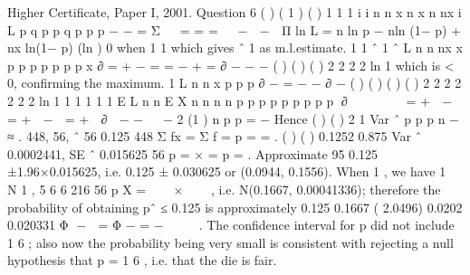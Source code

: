 \documentclass[a4paper,12pt]{article}
\begin{document}
Higher Certificate, Paper I, 2001. Question 6
( ) ( 1 ) ( )
1
1
1
i i
n n
x n x n nx
i
L p q p p q p p
p
− −
=
Σ   = = =   −  −  Π
ln L = n ln p − nln (1− p) + nx ln(1− p)
(ln ) 0 when 1 1 which gives ˆ 1 as m.l.estimate.
1 1 ˆ 1 ˆ
L n n nx x p
p p p p p p x
∂ = + − = = − + =
∂ − − −
( ) ( )
( )
2
2 2 2
ln 1
which is < 0, confirming the maximum.
1
L n n x
p p p
∂ −
= − −
∂ −
( ) ( ) ( ) ( )
2
2 2 2 2 2 2
ln 1 1 1
1 1 1
E L n n E X n n n n
p p p p p p p p p
∂        = +  −  = +  −  = +  ∂  − −   −
2 (1 )
n
p p
=
−
Hence ( ) ( ) 2 1
Var ˆ
p p
p
n
−
≈ .
448, 56, ˆ 56 0.125
448
Σ fx = Σ f = p = = .
( ) ( )
0.1252 0.875 Var ˆ 0.0002441, SE ˆ 0.015625
56
p = × = p = .
Approximate 95%
0.125 ±1.96×0.015625, i.e. 0.125 ± 0.030625 or (0.0944, 0.1556).
When 1 , we have 1 ~ N 1 , 5
6 6 216 56
p
X
=    ×   
, i.e. N(0.1667, 0.00041336); therefore
the probability of obtaining pˆ ≤ 0.125 is approximately
0.125 0.1667 ( 2.0496) 0.0202
0.020331
Φ −  = Φ − = −  
 
.
The confidence interval for p did not include 1
6
; also now the probability being very
small is consistent with rejecting a null hypothesis that p = 1
6
, i.e. that the die is fair.
\end{document}
